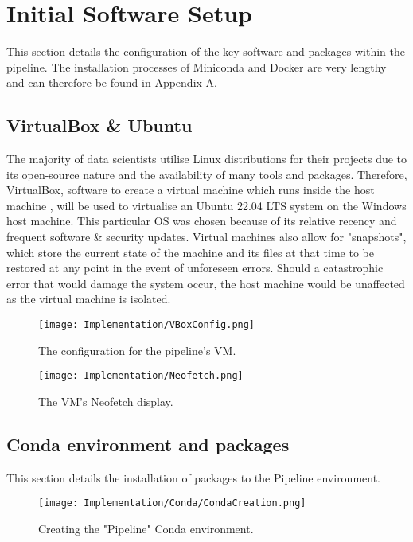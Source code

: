 \section{Initial Software Setup}
This section details the configuration of the key software and packages within the pipeline. The installation 
processes of Miniconda and Docker are very lengthy and can therefore be found in Appendix A.

\subsection{VirtualBox \& Ubuntu}
The majority of data scientists utilise Linux distributions for their projects due to its open-source nature and the 
availability of many tools and packages. Therefore, VirtualBox, software to create a virtual machine which runs inside the host 
machine \autocite{oracle_oracle_nodate}, will be used to virtualise an Ubuntu 22.04 LTS system on the Windows host machine. This 
particular OS was chosen because of its relative recency and frequent software \& security updates. Virtual machines
also allow for "snapshots", which store the current state of the machine and its files at that time to be restored at any point in the 
event of unforeseen errors. Should a catastrophic error that would damage the system occur, the host machine would be unaffected as the 
virtual machine is isolated.

\begin{figure}[H]
    \centering
    \texttt{[image: Implementation/VBoxConfig.png]}
    \caption{The configuration for the pipeline's VM.}
    \label{fig:VBoxConfig}
\end{figure}

\begin{figure}[H]
    \centering
    \texttt{[image: Implementation/Neofetch.png]}
    \caption{The VM's Neofetch display.}
    \label{fig:Neofetch}
\end{figure}

\subsection{Conda environment and packages}
This section details the installation of packages to the Pipeline environment.

\begin{figure}[H]
    \centering
    \texttt{[image: Implementation/Conda/CondaCreation.png]}
    \caption{Creating the "Pipeline" Conda environment.}
    \label{fig:CondaCreation}
\end{figure}

